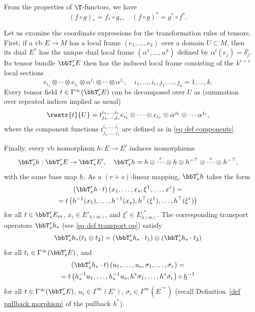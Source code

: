 \begin{rem}
    From the properties of $\T$-functors, we have 
    \[
    (f\circ g)_\ast=f_\ast\circ g_\ast,\quad (f\circ g)^\ast=g^\ast\circ f^\ast.
    \]
\end{rem}


\PRLsep

Let us examine the coordinate expressions for the transformation rules of tensors. First, if a \gls{vb}  $E\to M$ has a local frame $(e_1,\ldots,e_k)$ over a domain $U\subset M$, then its dual $E^\ast$ has the unique dual local frame $(\alpha^1,\ldots,\alpha^k)$ defined by $\alpha^i(e_j)=\delta^i_j$. Its tensor bundle $\bbT^r_s E$ then has the induced local frame consisting of the $k^{r+s}$ local sections
\[e_{i_1}\otimes\cdots\otimes e_{i_r}\otimes \alpha^{j_1}\otimes\cdots\otimes\alpha^{j_s},\quad i_1,\ldots,i_r,j_1,\ldots,j_s=1,\ldots,k.\]
Every tensor field $t\in \Gamma^\infty(\bbT^r_s E)$ can be decomposed over $U$ as (summation over repeated indices implied as usual)
\[\restr{t}{U}=t^{i_1,\ldots,i_r}_{j_1,\ldots,j_s}e_{i_1}\otimes\cdots\otimes e_{i_r}\otimes\alpha^{j_1}\otimes\cdots\alpha^{j_s},\]
where the component functions $t^{i_1,\ldots,i_r}_{j_1,\ldots,j_s}$ are defined as in \eqref{eq def components}. 

Finally, every \gls{vb} isomorphism $h:E\to E'$ induces isomorphisms 
\[\bbT^r_s h:\bbT^r_s E\to \bbT^r_s E',\quad \bbT^r_s h=h\otimes \overset{r}{\cdots}\otimes h\otimes h^{-\top}\otimes\overset{s}{\cdots}\otimes h^{-\top},\]
with the same base map $\underline{h}$. As a $(r+s)$-linear mapping, $\bbT^r_s h$ takes the form 
\begin{multline}
    \left(\bbT^r_s h \cdot t\right)(x_1,\ldots,x_s,\xi^1,\ldots,x^r)=\\
    =t\left(h^{-1}(x_1),\ldots,h^{-1}(x_s),h^\top(\xi^1),\ldots,h^\top(\xi^r)\right)
\end{multline}
for all $t\in \bbT^r_s E_m$, $x_i\in E'_{\underline{h}(m)}$, and $\xi^i\in E^{\prime\ast}_{\underline{h}(m)}$. The corresponding transport operators $\bbT^r_s h_\ast$ (see \eqref{eq def transport op}) satisfy 
\[\bbT^r_s h_\ast(t_1\otimes t_2)=(\bbT^r_s h_\ast \cdot t_1)\otimes(\bbT^r_s h_\ast \cdot t_2)\label{eq 2.4.15 RS1}\]
for all $t_i\in \Gamma^\infty(\bbT^r_s E)$, and 
\begin{multline}
    \left(\bbT^r_s h_\ast \cdot t\right)(u_1,\ldots,u_s,\sigma_1,\ldots,\sigma_r)=\\
    =t\left(h_\ast^{-1}u_1,\ldots,h_\ast^{-1}u_s,h^\ast \sigma_1,\ldots,h^\ast \sigma_r\right)\circ \underline{h}^{-1}
\end{multline}
for all $t\in \Gamma^\infty(\bbT^r_s E)$, $u_i\in\Gamma^\infty(E')$, $\sigma_i\in \Gamma^\infty(E^{\prime\ast})$ (recall Definition~\ref{def pullback morphism} of the pullback $h^\ast$).

